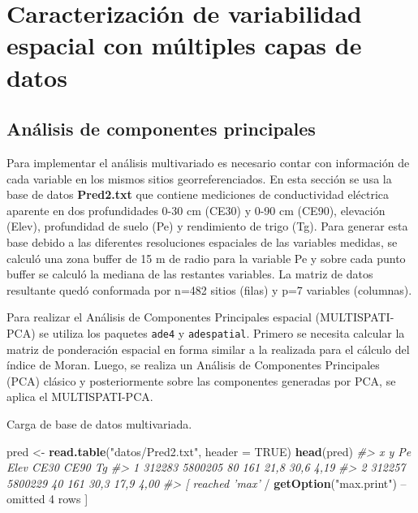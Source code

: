 \documentclass[11pt,b5paper,]{krantz}
\newenvironment{Shaded}{}{}
\newcommand{\CommentTok}[1]{\textcolor[rgb]{0.38,0.63,0.69}{\textit{#1}}}
\newcommand{\DataTypeTok}[1]{\textcolor[rgb]{0.56,0.13,0.00}{#1}}
\newcommand{\DecValTok}[1]{\textcolor[rgb]{0.25,0.63,0.44}{#1}}
\newcommand{\KeywordTok}[1]{\textcolor[rgb]{0.00,0.44,0.13}{\textbf{#1}}}
\newcommand{\NormalTok}[1]{#1}
\newcommand{\OperatorTok}[1]{\textcolor[rgb]{0.40,0.40,0.40}{#1}}
\newcommand{\OtherTok}[1]{\textcolor[rgb]{0.00,0.44,0.13}{#1}}
\newcommand{\StringTok}[1]{\textcolor[rgb]{0.25,0.44,0.63}{#1}}
\begin{document}
\hypertarget{caracterizaciuxf3n-de-variabilidad-espacial-con-muxfaltiples-capas-de-datos-1}{%
\section{Caracterización de variabilidad espacial con múltiples capas de datos}\label{caracterizaciuxf3n-de-variabilidad-espacial-con-muxfaltiples-capas-de-datos-1}}

\hypertarget{anuxe1lisis-de-componentes-principales-1}{%
\subsection{Análisis de componentes principales}\label{anuxe1lisis-de-componentes-principales-1}}

Para implementar el análisis multivariado es necesario contar con información de cada variable en los mismos sitios georreferenciados. En esta sección se usa la base de datos \textbf{Pred2.txt} que contiene mediciones de conductividad eléctrica aparente en dos profundidades 0-30 cm (CE30) y 0-90 cm (CE90), elevación (Elev), profundidad de suelo (Pe) y rendimiento de trigo (Tg). Para generar esta base debido a las diferentes resoluciones espaciales de las variables medidas, se calculó una zona buffer de 15 m de radio para la variable Pe y sobre cada punto buffer se calculó la mediana de las restantes variables. La matriz de datos resultante quedó conformada por n=482 sitios (filas) y p=7 variables (columnas).

Para realizar el Análisis de Componentes Principales espacial (MULTISPATI-PCA) se utiliza los paquetes \texttt{ade4} y \texttt{adespatial}. Primero se necesita calcular la matriz de ponderación espacial en forma similar a la realizada para el cálculo del índice de Moran. Luego, se realiza un Análisis de Componentes Principales (PCA) clásico y posteriormente sobre las componentes generadas por PCA, se aplica el MULTISPATI-PCA.

Carga de base de datos multivariada.

\begin{Shaded}
\begin{Highlighting}[]
\NormalTok{pred <-}\StringTok{ }\KeywordTok{read.table}\NormalTok{(}\StringTok{"datos/Pred2.txt"}\NormalTok{, }
                   \DataTypeTok{header =} \OtherTok{TRUE}\NormalTok{)}
\KeywordTok{head}\NormalTok{(pred)}
\CommentTok{#> x y Pe Elev CE30 CE90 Tg}
\CommentTok{#> 1 312283 5800205 80 161 21,8 30,6 4,19}
\CommentTok{#> 2 312257 5800229 40 161 30,3 17,9 4,00}
\CommentTok{#> [ reached 'max'}
    \OperatorTok{/}\StringTok{ }\KeywordTok{getOption}\NormalTok{(}\StringTok{"max.print"}\NormalTok{) }\OperatorTok{--}
\NormalTok{omitted }\DecValTok{4}\NormalTok{ rows ]}
\end{Highlighting}
\end{Shaded}
\end{document}
